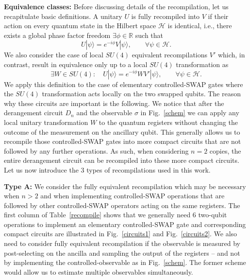 \documentclass[aps,prx,showpacs,twocolumn,reprint]{revtex4-2}
\begin{document}
{\textbf{Equivalence classes:} Before discussing details of the recompilation, let us recapitulate basic definitions. A unitary $U$
is fully recompiled into $V$ if their action on every quantum state in the Hilbert space $\mathcal{H}$
is identical, i.e., there exists a global phase factor freedom $\exists \phi \in \mathbb{R}$ such that
\begin{equation*}
	U | \psi \rangle = e^{-i\phi} V |\psi \rangle, \quad \quad \forall \psi \in \mathcal{H}.
\end{equation*}
We also consider the case of local $SU(4)$ equivalent recompilations $V'$ which, in contrast, 
result in equivalence only up to a local $SU(4)$ transformation as
\begin{equation*}
	\exists W \in SU(4):\quad 
	U | \psi \rangle = e^{-i\phi} W V' |\psi \rangle, \quad \quad \forall \psi \in \mathcal{H}.
\end{equation*}
We apply this definition to the case of elementary controlled-SWAP gates where the $SU(4)$ transformation
acts locally on the two swapped qubits.
The reason why these circuits are important is the following. We notice that after the derangement circuit
$D_n$ and the observable $\sigma$ in Fig.~\ref{schem}
we can apply any local unitary transformation $W$ to the quantum registers without changing the outcome of the measurement
on the ancillary qubit. This generally allows us to recompile those controlled-SWAP gates into more compact circuits
that are not followed by any further operations.
As such, when considering $n=2$ copies, the entire derangement circuit can be recompiled into these more
compact circuits.
Let us now introduce the 3 types of recompilations used in this work.


\textbf{Type A:}
We consider the fully equivalent recompilation which may be necessary when $n>2$ and when implementing controlled-SWAP
operations that are followed by other controlled-SWAP operators acting on the same registers. The first column of
Table~\ref{recompile} shows that we generally need $6$ two-qubit operations to implement an elementary controlled-SWAP gate
and corresponding compact circuits are illustrated in Fig.~\ref{circuits1} and Fig.~\ref{circuits2}.
We also need to consider fully equivalent recompilation if the observable is measured by post-selecting on the ancilla and sampling
the output of the registers -- and not by implementing the controlled-observable as in Fig.~\ref{schem}. The former scheme would
allow us to estimate multiple observables simultaneously.



}
\end{document}

